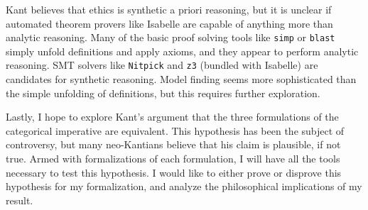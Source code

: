 \begin{isabellebody}
\begin{isamarkuptext}
Kant believes that ethics is synthetic a priori reasoning, but it is unclear if automated theorem provers 
like Isabelle are capable of anything more than analytic reasoning. Many of the basic proof solving 
tools like \texttt{simp} or \texttt{blast} simply unfold definitions and apply axioms, and they appear to 
perform analytic reasoning. SMT solvers like \texttt{Nitpick} and \texttt{z3} (bundled with Isabelle) are 
candidates for synthetic reasoning. Model finding seems more sophisticated than the simple unfolding
of definitions, but this requires further exploration.

Lastly, I hope to explore Kant's argument that the three formulations of the categorical imperative are 
equivalent. This hypothesis has been the subject of controversy, but many neo-Kantians believe that his 
claim is plausible, if not true. Armed with formalizations of each formulation, I will have all the tools 
necessary to test this hypothesis. I would like to either prove or disprove this hypothesis
for my formalization, and analyze the philosophical implications of my result.%
\end{isamarkuptext}\isamarkuptrue%
%
\isadelimtheory
%
\endisadelimtheory
%
\isatagtheory
%
\endisatagtheory
{\isafoldtheory}%
%
\isadelimtheory
%
\endisadelimtheory
%
\end{isabellebody}%
\endinput
